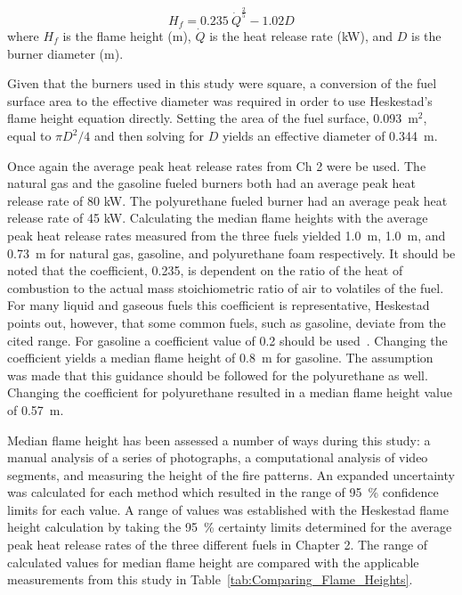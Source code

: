 \documentclass[twoside]{uocthesis}
\begin{document}
{\begin{equation}\label{eq:flame_height}
H_f = 0.235\: \dot{Q}^{\frac{2}{5}} - 1.02 D
\end{equation}
where $H_{f}$ is the flame height (m), $\dot{Q}$ is the heat release rate (kW), and $D$ is the burner diameter (m).

Given that the burners used in this study were square, a conversion of the fuel surface area to the effective diameter was required in order to use Heskestad's flame height equation directly.  Setting the area of the fuel surface, 0.093~m$^2$, equal to $\pi D^2/4$ and then solving for $D$ yields an effective diameter of 0.344~m.

Once again the average peak heat release rates from Ch 2 were be used.  The natural gas and the gasoline fueled burners both had an average peak heat release rate of 80 kW.  The polyurethane fueled burner had an average peak heat release rate of 45 kW.  Calculating the median flame heights with the average peak heat release rates measured from the three fuels yielded 1.0~m, 1.0~m, and 0.73~m for natural gas, gasoline, and polyurethane foam respectively. It should be noted that the coefficient, 0.235, is dependent on the ratio of the heat of combustion to the actual mass stoichiometric ratio of air to volatiles of the fuel.  For many liquid and gaseous fuels this coefficient is representative, Heskestad points out, however, that some common fuels, such as gasoline, deviate from the cited range. For gasoline a coefficient value of 0.2 should be used~\cite{Heskestad:SFPE}. Changing the coefficient yields a median flame height of 0.8~m for gasoline.  The assumption was made that this guidance should be followed for the polyurethane as well. Changing the coefficient for polyurethane resulted in a median flame height value of 0.57~m. 

Median flame height has been assessed a number of ways during this study: a manual analysis of a series of photographs, a computational analysis of video segments, and measuring the height of the fire patterns.  An expanded uncertainty was calculated for each method which resulted in the range of 95~\% confidence limits for each value.  A range of values was established with the Heskestad flame height calculation by taking the 95~\% certainty limits determined for the average peak heat release rates of the three different fuels in Chapter 2.  The range of calculated values for median flame height are compared with the applicable measurements from this study in Table~\ref{tab:Comparing_Flame_Heights}.

}
\end{document}
